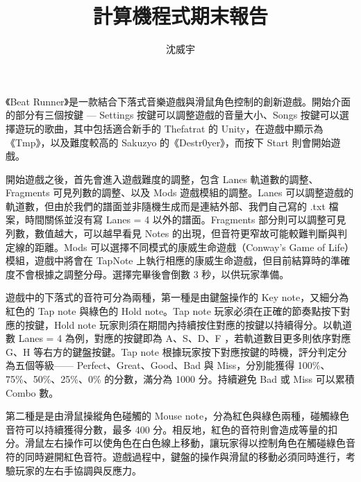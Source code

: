\documentclass[a4paper,12pt]{article}
\begin{document}
\title{計算機程式期末報告}
\author{沈威宇}
\date{\temtoday}
\titletocdoc
\hypersetup{
  colorlinks=true,
  linkcolor=blue,
  urlcolor=blue,
  citecolor=blue
}
《Beat Runner》是一款結合下落式音樂遊戲與滑鼠角色控制的創新遊戲。開始介面的部分有三個按鍵 — Settings 按鍵可以調整遊戲的音量大小、Songs 按鍵可以選擇遊玩的歌曲，其中包括適合新手的 Thefatrat 的 Unity，在遊戲中顯示為《Tmp》，以及難度較高的 Sakuzyo 的《Destr0yer》，而按下 Start 則會開始遊戲。

開始遊戲之後，首先會進入遊戲難度的調整，包含 Lanes 軌道數的調整、Fragments 可見列數的調整、以及 Mods 遊戲模組的調整。Lanes 可以調整遊戲的軌道數，但由於我們的譜面並非隨機生成而是連結外部、我們自己寫的 .txt 檔案，時間關係並沒有寫 Lanes = 4 以外的譜面。Fragments 部分則可以調整可見列數，數值越大，可以越早看見 Notes 的出現，但音符更窄故可能較難判斷與判定線的距離。Mods 可以選擇不同模式的康威生命遊戲（Conway's Game of Life）模組，遊戲中將會在 TapNote 上執行相應的康威生命遊戲，但目前結算時的準確度不會根據之調整分母。選擇完畢後會倒數 3 秒，以供玩家準備。

遊戲中的下落式的音符可分為兩種，第一種是由鍵盤操作的 Key note，又細分為紅色的 Tap note 與綠色的 Hold note。Tap note 玩家必須在正確的節奏點按下對應的按鍵，Hold note 玩家則須在期間內持續按住對應的按鍵以持續得分。以軌道數 Lanes = 4 為例，對應的按鍵即為 A、S、D、F ，若軌道數目更多則依序對應 G、H 等右方的鍵盤按鍵。Tap note 根據玩家按下對應按鍵的時機，評分判定分為五個等級—— Perfect、Great、Good、Bad 與 Miss，分別能獲得 100\%、75\%、50\%、25\%、0\% 的分數，滿分為 1000 分。持續避免 Bad 或 Miss 可以累積 Combo 數。

第二種是是由滑鼠操縱角色碰觸的 Mouse note，分為紅色與綠色兩種，碰觸綠色音符可以持續獲得分數，最多 400 分。相反地，紅色的音符則會造成等量的扣分。滑鼠左右操作可以使角色在白色線上移動，讓玩家得以控制角色在觸碰綠色音符的同時避開紅色音符。遊戲過程中，鍵盤的操作與滑鼠的移動必須同時進行，考驗玩家的左右手協調與反應力。
\end{document}
